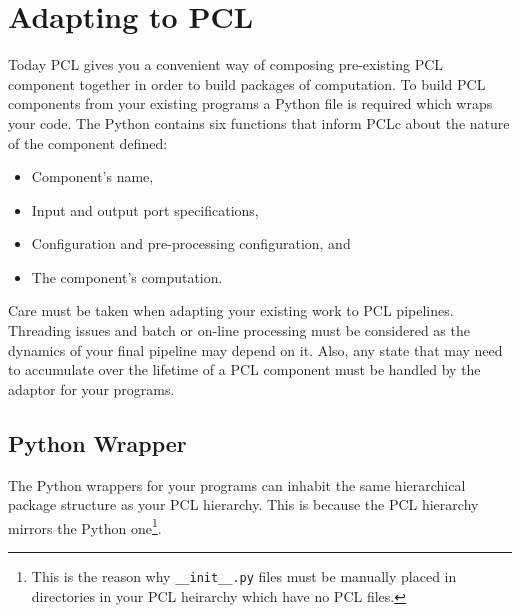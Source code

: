 \chapter{Adapting to PCL}
Today PCL gives you a convenient way of composing pre-existing PCL component together in order to build packages of computation. To build PCL components from your existing programs a Python file is required which wraps your code. The Python contains six functions that inform PCLc about the nature of the component defined:
\begin{itemize}
\item Component's name,
\item Input and output port specifications,
\item Configuration and pre-processing configuration, and
\item The component's computation.
\end{itemize}

Care must be taken when adapting your existing work to PCL pipelines. Threading issues and batch or on-line processing must be considered as the dynamics of your final pipeline may depend on it. Also, any state that may need to accumulate over the lifetime of a PCL component must be handled by the adaptor for your programs.

\section{Python Wrapper}
The Python wrappers for your programs can inhabit the same hierarchical package structure as your PCL hierarchy. This is because the PCL hierarchy mirrors the Python one\footnote{This is the reason why \texttt{\_\_init\_\_.py} files must be manually placed in directories in your PCL heirarchy which have no PCL files.}.


